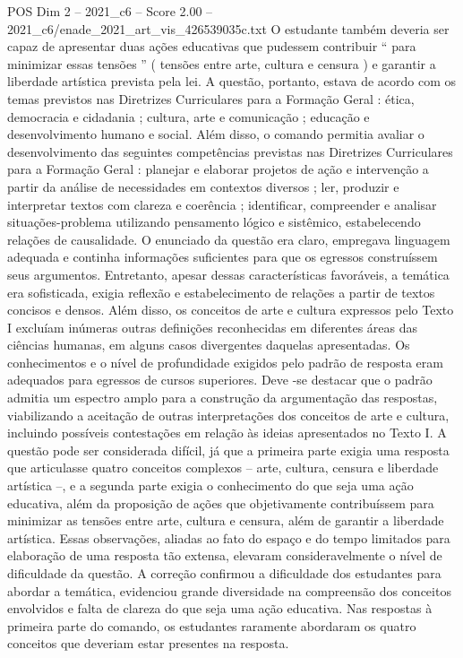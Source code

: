 \begin{textsample}{POS Dim 2 – 2021\_c6 – Score 2.00 – 2021\_c6/enade\_2021\_art\_vis\_426539035c.txt}
O estudante também deveria ser capaz de apresentar duas ações educativas que pudessem contribuir “ para minimizar essas tensões ” ( tensões entre arte, cultura e censura ) e garantir a liberdade artística prevista pela lei.
A questão, portanto, estava de acordo com os temas previstos nas Diretrizes Curriculares para a Formação Geral : ética, democracia e cidadania ; cultura, arte e comunicação ; educação e desenvolvimento humano e social.
Além disso, o comando permitia avaliar o desenvolvimento das seguintes competências previstas nas Diretrizes Curriculares para a Formação Geral : planejar e elaborar projetos de ação e intervenção a partir da análise de necessidades em contextos diversos ; ler, produzir e interpretar textos com clareza e coerência ; identificar, compreender e analisar situações-problema utilizando pensamento lógico e sistêmico, estabelecendo relações de causalidade.
O enunciado da questão era claro, empregava linguagem adequada e continha informações suficientes para que os egressos construíssem seus argumentos.
Entretanto, apesar dessas características favoráveis, a temática era sofisticada, exigia reflexão e estabelecimento de relações a partir de textos concisos e densos.
Além disso, os conceitos de arte e cultura expressos pelo Texto I excluíam inúmeras outras definições reconhecidas em diferentes áreas das ciências humanas, em alguns casos divergentes daquelas apresentadas.
Os conhecimentos e o nível de profundidade exigidos pelo padrão de resposta eram adequados para egressos de cursos superiores.
Deve -se destacar que o padrão admitia um espectro amplo para a construção da argumentação das respostas, viabilizando a aceitação de outras interpretações dos conceitos de arte e cultura, incluindo possíveis contestações em relação às ideias apresentados no Texto I.
A questão pode ser considerada difícil, já que a primeira parte exigia uma resposta que articulasse quatro conceitos complexos – arte, cultura, censura e liberdade artística –, e a segunda parte exigia o conhecimento do que seja uma ação educativa, além da proposição de ações que objetivamente contribuíssem para minimizar as tensões entre arte, cultura e censura, além de garantir a liberdade artística.
Essas observações, aliadas ao fato do espaço e do tempo limitados para elaboração de uma resposta tão extensa, elevaram consideravelmente o nível de dificuldade da questão.
A correção confirmou a dificuldade dos estudantes para abordar a temática, evidenciou grande diversidade na compreensão dos conceitos envolvidos e falta de clareza do que seja uma ação educativa.
Nas respostas à primeira parte do comando, os estudantes raramente abordaram os quatro conceitos que deveriam estar presentes na resposta.

\end{textsample}
